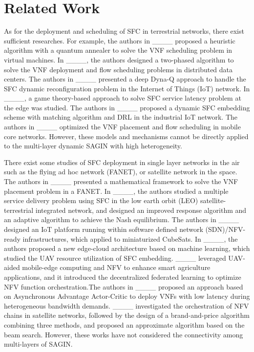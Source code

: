 \section{Related Work\label{sec:Related-Work}
}
As for the deployment and scheduling of SFC in terrestrial networks, there exist sufficient researches. For example, the authors in ____ proposed a heuristic algorithm with a quantum annealer to solve the VNF scheduling problem in virtual machines. In ____, the authors designed a two-phased algorithm to solve the VNF deployment and flow scheduling problems in distributed data centers. The authors in ____ presented a deep Dyna-Q approach to handle the SFC dynamic reconfiguration problem in the Internet of Things (IoT) network. In ____, a game theory-based approach to solve SFC service latency problem at the edge was studied. The authors in ____ proposed a dynamic SFC embedding scheme with matching algorithm and DRL in the industrial IoT network. The authors in ____ optimized the VNF placement and flow scheduling in mobile core networks. However, these models and mechanisms cannot be directly applied to the multi-layer dynamic SAGIN with high heterogeneity.

There exist some studies of SFC deployment in single layer networks in the air such as the flying ad hoc network (FANET), or satellite network in the space. The authors in ____ presented a mathematical framework to solve the VNF placement problem in a FANET. In ____, the authors studied a multiple service delivery problem using SFC in the low earth orbit (LEO) satellite-terrestrial integrated network, and designed an improved response algorithm and an adaptive algorithm to achieve the Nash equilibrium. The authors in ____ designed an IoT platform running within software defined network (SDN)/NFV-ready infrastructures, which applied to miniaturized CubeSats. In ____, the authors proposed a new edge-cloud architecture based on machine learning, which studied the UAV resource utilization of SFC embedding. ____ leveraged UAV-aided mobile-edge computing and NFV to enhance smart agriculture applications, and it introduced  the decentralized federated learning to optimize NFV function orchestration.The authors in ____ proposed an approach based on Asynchronous Advantage Actor-Critic to deploy VNFs with low latency during heterogeneous bandwidth demands. ____ investigated the orchestration of NFV chains in satellite networks, followed by the design of a brand-and-price algorithm combining three methods, and proposed an approximate algorithm based on the beam search. However, these works have not considered the connectivity among multi-layers of SAGIN.


